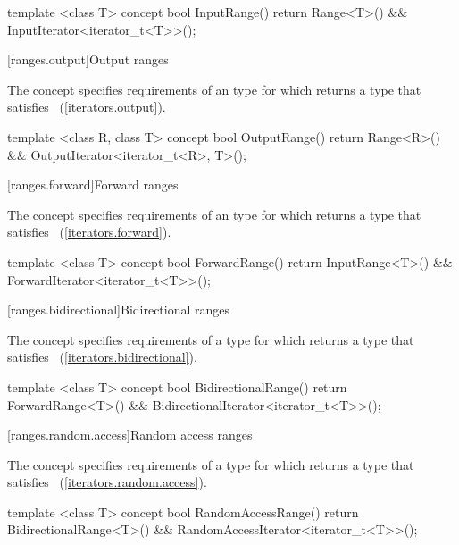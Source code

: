 \begin{codeblock}
template <class T>
concept bool InputRange() {
  return Range<T>() && InputIterator<iterator_t<T>>();
}
\end{codeblock}

[ranges.output]{Output ranges}

\pnum
The  concept specifies requirements of
an  type for which  returns a type that satisfies
~(\ref{iterators.output}).

\begin{codeblock}
template <class R, class T>
concept bool OutputRange() {
  return Range<R>() && OutputIterator<iterator_t<R>, T>();
}
\end{codeblock}

[ranges.forward]{Forward ranges}

\pnum
The  concept specifies requirements of an
 type for which  returns a type that satisfies
~(\ref{iterators.forward}).

\begin{codeblock}
template <class T>
concept bool ForwardRange() {
  return InputRange<T>() && ForwardIterator<iterator_t<T>>();
}
\end{codeblock}

[ranges.bidirectional]{Bidirectional ranges}

\pnum
The  concept specifies requirements of a
 type for which  returns a type that satisfies
~(\ref{iterators.bidirectional}).

\begin{codeblock}
template <class T>
concept bool BidirectionalRange() {
  return ForwardRange<T>() && BidirectionalIterator<iterator_t<T>>();
}
\end{codeblock}

[ranges.random.access]{Random access ranges}

\pnum
The  concept specifies requirements of a
 type for which  returns a type that satisfies
~(\ref{iterators.random.access}).

\begin{codeblock}
template <class T>
concept bool RandomAccessRange() {
  return BidirectionalRange<T>() && RandomAccessIterator<iterator_t<T>>();
}
\end{codeblock}

